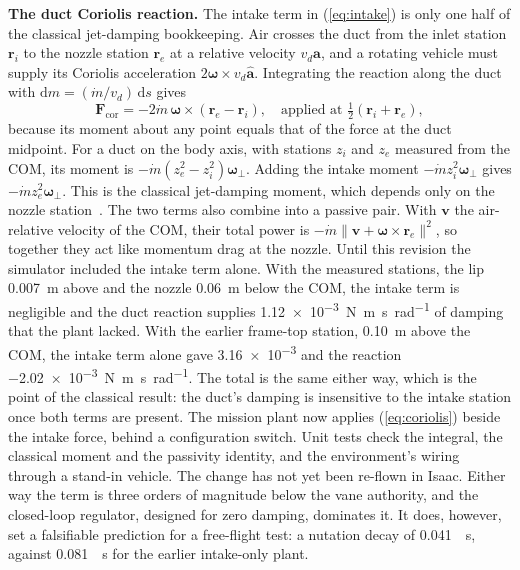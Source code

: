 \documentclass[journal]{IEEEtran}
\newcommand{\refeq}[1]{(\ref{#1})}
\newcommand{\vect}[1]{\bm{#1}}
\newcommand{\wb}{\vect{\omega}}
\newcommand{\mdot}{\dot{m}}
\begin{document}
\textbf{The duct Coriolis reaction.}
The intake term in \refeq{eq:intake} is only one half of the classical jet-damping bookkeeping.
Air crosses the duct from the inlet station $\vect{r}_i$ to the nozzle station $\vect{r}_e$ at a relative velocity $v_d\hat{\vect{a}}$, and a rotating vehicle must supply its Coriolis acceleration $2\wb\times v_d\hat{\vect{a}}$.
Integrating the reaction along the duct with $\mathrm{d}m = (\mdot/v_d)\,\mathrm{d}s$ gives
\begin{equation}
\vect{F}_{\text{cor}} = -2\mdot\,\wb\times(\vect{r}_e - \vect{r}_i), \quad \text{applied at } \tfrac12(\vect{r}_i + \vect{r}_e),
\label{eq:coriolis}
\end{equation}
because its moment about any point equals that of the force at the duct midpoint.
For a duct on the body axis, with stations $z_i$ and $z_e$ measured from the COM, its moment is $-\mdot(z_e^2 - z_i^2)\wb_\perp$.
Adding the intake moment $-\mdot z_i^2\wb_\perp$ gives $-\mdot z_e^2\wb_\perp$.
This is the classical jet-damping moment, which depends only on the nozzle station~\cite{thomson1986}.
The two terms also combine into a passive pair.
With $\vect{v}$ the air-relative velocity of the COM, their total power is $-\mdot\|\vect{v} + \wb\times\vect{r}_e\|^2$, so together they act like momentum drag at the nozzle.
Until this revision the simulator included the intake term alone.
With the measured stations, the lip \SI{0.007}{\metre} above and the nozzle \SI{0.06}{\metre} below the COM, the intake term is negligible and the duct reaction supplies \SI{1.12e-3}{\newton\metre\second\per\radian} of damping that the plant lacked.
With the earlier frame-top station, \SI{0.10}{\metre} above the COM, the intake term alone gave \SI{3.16e-3}{} and the reaction \SI{-2.02e-3}{\newton\metre\second\per\radian}.
The total is the same either way, which is the point of the classical result: the duct's damping is insensitive to the intake station once both terms are present.
The mission plant now applies \refeq{eq:coriolis} beside the intake force, behind a configuration switch.
Unit tests check the integral, the classical moment and the passivity identity, and the environment's wiring through a stand-in vehicle.
The change has not yet been re-flown in Isaac.
Either way the term is three orders of magnitude below the vane authority, and the closed-loop regulator, designed for zero damping, dominates it.
It does, however, set a falsifiable prediction for a free-flight test: a nutation decay of \SI{0.041}{\per\second}, against \SI{0.081}{\per\second} for the earlier intake-only plant.
\end{document}
